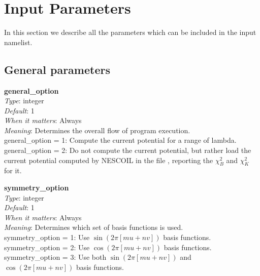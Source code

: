\chapter{Input Parameters}
\label{ch:input}

\newcommand{\param}[5]{{\setlength{\parindent}{0cm} {\ttfamily \bfseries \hypertarget{#1}{#1}}\\{\it Type}: #2\\{\it Default}: #3\\{\it When it matters}: #4\\{\it Meaning}: #5}}
\newcommand{\myhrule}{{\setlength{\parindent}{0cm} \hrulefill }}

\newcommand{\true}{{\ttfamily .true.}}
\newcommand{\false}{{\ttfamily .false.}}

In this section we describe all the parameters which can be included in the input namelist. 

\section{General parameters}

\param{general\_option}
{integer}
{1}
{Always}
{Determines the overall flow of program execution.\\

{\ttfamily general\_option} = 1: Compute the current potential for a range of lambda.\\

{\ttfamily general\_option} = 2: Do not compute the current potential, but rather load the current potential computed
by NESCOIL in the file \parlink{nescout\_filename}, reporting the $\chi^2_B$ and $\chi^2_K$ for it.
}

\myhrule

\param{symmetry\_option}
{integer}
{1}
{Always}
{Determines which set of basis functions is used.\\

{\ttfamily symmetry\_option} = 1: Use $\sin(2 \pi [mu+nv])$ basis functions.\\

{\ttfamily symmetry\_option} = 2: Use $\cos(2 \pi [mu+nv])$ basis functions.\\

{\ttfamily symmetry\_option} = 3: Use both $\sin(2 \pi [mu+nv])$ and $\cos(2 \pi [mu+nv])$ basis functions.
}

\myhrule

